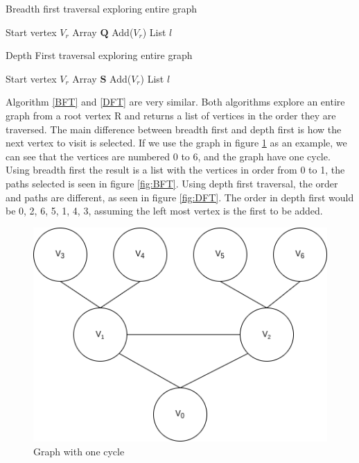 \begin{algorithm}[H]
    \caption{Breadth first traversal exploring entire graph}
    \label{BFT}
    \SetAlgoLined
    Start vertex $V_r$\; Array $\mathbf{Q}$ Add($V_r$)\; List $l$\;
    \;
\end{algorithm}

\begin{algorithm}[H]
    \caption{Depth First traversal exploring entire graph}
    \label{DFT}
    \SetAlgoLined
    Start vertex $V_r$\; Array $\mathbf{S}$ Add($V_r$)\; List $l$\;
    \;
\end{algorithm}

Algorithm \ref{BFT} and \ref{DFT} are very similar. Both algorithms explore an entire graph from a root vertex R and returns a list of vertices in the order they are traversed. The main difference between breadth first and depth first is how the next vertex to visit is selected. If we use the graph in figure \ref{fig:graph} as an example, we can see that the vertices are numbered 0 to 6, and the graph have one cycle. Using breadth first the result is a list with the vertices in order from 0 to 1, the paths selected is seen in figure \ref{fig:BFT}. Using depth first traversal, the order and paths are different, as seen in figure \ref{fig:DFT}. The order in depth first would be 0, 2, 6, 5, 1, 4, 3, assuming the left most vertex is the first to be added.

\begin{figure}[h]
    \centering
    \includegraphics[scale=0.5]{figs/Graph.png}
    \caption{Graph with one cycle}
    \label{fig:graph}
\end{figure}

